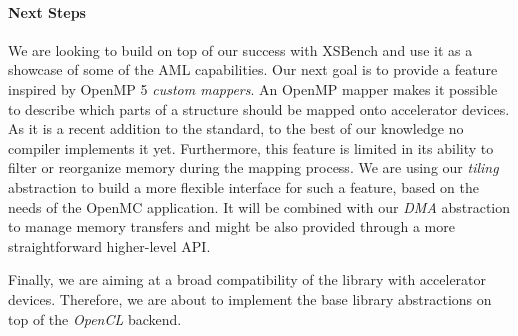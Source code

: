 \paragraph{Next Steps}

We are looking to build on top of our success with XSBench and use it as a
showcase of some of the AML capabilities. Our next goal is to provide a feature
inspired by OpenMP 5 \emph{custom mappers}. An OpenMP mapper makes it possible to
describe which parts of a structure should be mapped onto
accelerator devices. As it is a recent addition to the standard, to the best
of our knowledge no compiler implements it yet. Furthermore, this feature is
limited in its ability to filter or reorganize memory during the mapping
process. We are using our \emph{tiling} abstraction to build a more
flexible interface for such a feature, based on the needs of the OpenMC
application. It will be combined with our \emph{DMA} abstraction to manage
memory transfers and might be also provided through a more straightforward
higher-level API.

Finally, we are aiming at a broad compatibility of the library with accelerator
devices.  Therefore, we are about to implement the base library abstractions on
top of the \emph{OpenCL} backend.
